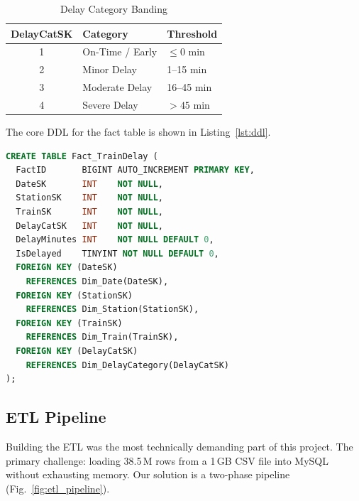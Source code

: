 \documentclass[conference]{IEEEtran}
\begin{document}
\begin{table}[htbp]
  \caption{Delay Category Banding}
  \label{tab:delay_categories}
  \begin{center}
    \begin{tabular}{|c|l|l|}
      \hline
      \textbf{DelayCatSK} & \textbf{Category} & \textbf{Threshold} \\
      \hline
      1 & On-Time / Early    & $\leq 0$ min \\
      2 & Minor Delay        & 1--15 min \\
      3 & Moderate Delay     & 16--45 min \\
      4 & Severe Delay       & $>45$ min \\
      \hline
    \end{tabular}
  \end{center}
\end{table}

The core DDL for the fact table is shown in Listing~\ref{lst:ddl}.

\begin{lstlisting}[language=SQL,
                   caption={Core DDL for \texttt{Fact\_TrainDelay}},
                   label=lst:ddl]
CREATE TABLE Fact_TrainDelay (
  FactID       BIGINT AUTO_INCREMENT PRIMARY KEY,
  DateSK       INT    NOT NULL,
  StationSK    INT    NOT NULL,
  TrainSK      INT    NOT NULL,
  DelayCatSK   INT    NOT NULL,
  DelayMinutes INT    NOT NULL DEFAULT 0,
  IsDelayed    TINYINT NOT NULL DEFAULT 0,
  FOREIGN KEY (DateSK)
    REFERENCES Dim_Date(DateSK),
  FOREIGN KEY (StationSK)
    REFERENCES Dim_Station(StationSK),
  FOREIGN KEY (TrainSK)
    REFERENCES Dim_Train(TrainSK),
  FOREIGN KEY (DelayCatSK)
    REFERENCES Dim_DelayCategory(DelayCatSK)
);
\end{lstlisting}

\subsection{ETL Pipeline}
\label{subsec:etl}

Building the ETL was the most technically demanding part of this project.
The primary challenge: loading 38.5\,M rows from a 1\,GB CSV file into
MySQL without exhausting memory.
Our solution is a two-phase pipeline (Fig.~\ref{fig:etl_pipeline}).
\end{document}
